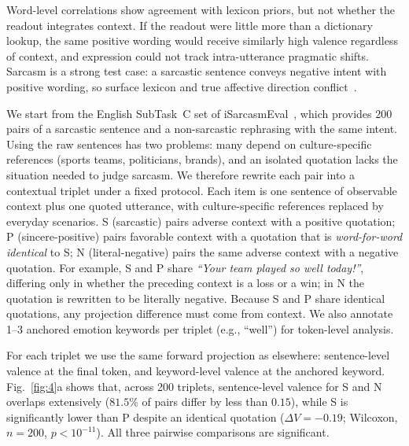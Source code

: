 \documentclass[letterpaper, 10 pt, conference]{ieeeconf/ieeeconf}
\begin{document}
Word-level correlations show agreement with lexicon priors, but not whether the readout integrates context. If the readout were little more than a dictionary lookup, the same positive wording would receive similarly high valence regardless of context, and expression could not track intra-utterance pragmatic shifts. Sarcasm is a strong test case: a sarcastic sentence conveys negative intent with positive wording, so surface lexicon and true affective direction conflict~\cite{abufarha2022isarcasm}.

We start from the English SubTask~C set of iSarcasmEval~\cite{abufarha2022isarcasm}, which provides 200 pairs of a sarcastic sentence and a non-sarcastic rephrasing with the same intent. Using the raw sentences has two problems: many depend on culture-specific references (sports teams, politicians, brands), and an isolated quotation lacks the situation needed to judge sarcasm. We therefore rewrite each pair into a contextual triplet under a fixed protocol. Each item is one sentence of observable context plus one quoted utterance, with culture-specific references replaced by everyday scenarios. S (sarcastic) pairs adverse context with a positive quotation; P (sincere-positive) pairs favorable context with a quotation that is \emph{word-for-word identical} to S; N (literal-negative) pairs the same adverse context with a negative quotation. For example, S and P share \emph{``Your team played so well today!''}, differing only in whether the preceding context is a loss or a win; in N the quotation is rewritten to be literally negative. Because S and P share identical quotations, any projection difference must come from context. We also annotate 1--3 anchored emotion keywords per triplet (e.g., ``well'') for token-level analysis.

For each triplet we use the same forward projection as elsewhere: sentence-level valence at the final token, and keyword-level valence at the anchored keyword. Fig.~\ref{fig:4}a shows that, across 200 triplets, sentence-level valence for S and N overlaps extensively ($81.5\%$ of pairs differ by less than $0.15$), while S is significantly lower than P despite an identical quotation ($\Delta V=-0.19$; Wilcoxon, $n{=}200$, $p<10^{-11}$). All three pairwise comparisons are significant.
\end{document}
